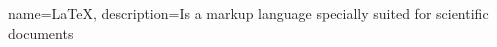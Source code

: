 
{
    name=LaTeX,
    description={Is a markup language specially suited 
    for scientific documents}
}